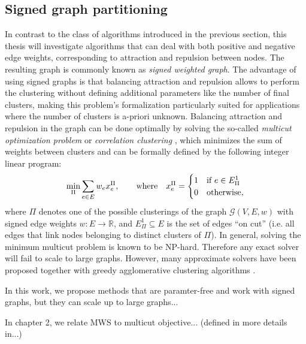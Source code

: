 \subsection{Signed graph partitioning}
In contrast to the class of algorithms introduced in the previous section, this thesis will investigate algorithms that can
deal with both positive and negative edge weights, corresponding to attraction and repulsion between nodes. The resulting graph is commonly known as \emph{signed weighted graph}. The advantage of using signed graphs is that balancing attraction and repulsion allows to perform the clustering without defining additional parameters like the number of final clusters, making this problem's formalization particularly suited for applications where the number of clusters is a-priori unknown. Balancing attraction and repulsion in the graph can be done optimally by solving the so-called \emph{multicut optimization problem} or \emph{correlation clustering} \cite{kappes2011globally,chopra1991multiway}, which minimizes the sum of weights between clusters and can be formally defined by the following integer linear program:
\begin{equation}\label{eq:MC_objective_intro}
 \min_\Pi \sum_{e\in E} w_e x_e^\Pi,  \qquad \text{where} \quad x^\Pi_e = 
 \begin{cases} 
 1 & \text{if } e\in E^1_\Pi \\
 0 & \text{otherwise},
 \end{cases}
\end{equation}
where $\Pi$ denotes one of the possible clusterings of the graph $\mathcal{G}(V,E,w)$ with signed edge weights $w:E\rightarrow \mathbb{R}$, and $E_\Pi^1 \subseteq E$ is the set of edges ``on cut'' (i.e. all edges that link nodes belonging to distinct clusters of $\Pi$). 
In general, solving the minimum multicut problem is known to be NP-hard. Therefore any exact solver will fail to scale to large graphs. However, many approximate solvers have been proposed \cite{lange2018combinatorial,pape2017solving,beier2016efficient,yarkony2012fast} together with greedy agglomerative clustering algorithms \cite{keuper2015efficient,levinkov2017comparative,wolf2018mutex,kardoostsolving}. 

In this work, we propose methods that are paramter-free and work with signed graphs, but they can scale up to large graphs...

In chapter 2, we relate MWS to multicut objective... (defined in more details in...)

